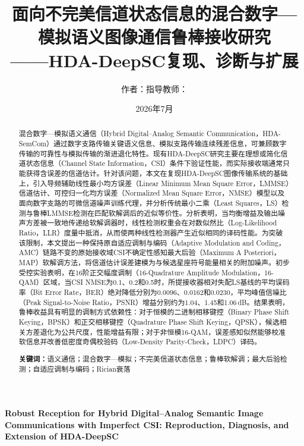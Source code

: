 \documentclass[UTF8,a4paper,11pt]{ctexart}
\title{\heiti 面向不完美信道状态信息的混合数字—模拟语义图像通信鲁棒接收研究\\[0.5em]
\large ——HDA-DeepSC复现、诊断与扩展}
\author{作者：\underline{\hspace{4cm}}\qquad 指导教师：\underline{\hspace{4cm}}}
\date{2026年7月}
\newcommand{\HDADeepSC}{HDA-DeepSC}
\newcommand{\CSI}{CSI}
\newcommand{\AMC}{AMC}
\newcommand{\BER}{BER}
\newcommand{\PSNR}{PSNR}
\newcommand{\NMSE}{NMSE}
\newcommand{\LLR}{LLR}
\newcommand{\LDPC}{LDPC}
\begin{document}
\maketitle

\begin{abstract}
混合数字—模拟语义通信（Hybrid Digital--Analog Semantic Communication，HDA-SemCom）通过数字支路传输关键语义信息、模拟支路传输连续残差信息，可兼顾数字传输的可靠性与模拟传输的渐进退化特性。现有\HDADeepSC{}研究主要在理想或简化信道状态信息（Channel State Information，\CSI）条件下验证性能，而实际接收端通常只能获得含误差的信道估计。针对该问题，本文在复现\HDADeepSC{}图像传输系统的基础上，引入导频辅助线性最小均方误差（Linear Minimum Mean Square Error，LMMSE）信道估计、可控归一化均方误差（Normalized Mean Square Error，\NMSE）模型以及面向数字支路的可微信道噪声训练代理，并分析传统最小二乘（Least Squares，LS）检测与鲁棒LMMSE检测在匹配软解调后的近似等价性。分析表明，当均衡增益及输出噪声方差被一致地传递给软解调器时，线性检测权重会在对数似然比（Log-Likelihood Ratio，\LLR）度量中抵消，从而使两种线性检测器产生近似相同的译码性能。为突破该限制，本文提出一种保持原自适应调制与编码（Adaptive Modulation and Coding，\AMC）链路不变的原始接收域\CSI{}不确定性感知最大后验（Maximum A Posteriori，MAP）软解调方法，将信道估计误差建模为与候选星座符号能量相关的附加噪声。初步受控实验表明，在16阶正交幅度调制（16-Quadrature Amplitude Modulation，16-QAM）区域，当\CSI{} \NMSE{}为0.1、0.2和0.5时，所提接收器相对失配LS基线的平均误码率（Bit Error Rate，\BER）绝对降低分别为0.0096、0.0162和0.0230，平均峰值信噪比（Peak Signal-to-Noise Ratio，\PSNR）增益分别约为1.04、1.45和1.06\,dB。结果表明，鲁棒收益具有明显的调制方式依赖性：对于恒模的二进制相移键控（Binary Phase Shift Keying，BPSK）和正交相移键控（Quadrature Phase Shift Keying，QPSK），候选相关方差退化为公共尺度，性能增益有限；对于非恒模16-QAM，误差感知似然能够校准软信息并改善低密度奇偶校验码（Low-Density Parity-Check，\LDPC）译码。

\noindent\textbf{关键词：}语义通信；混合数字—模拟；不完美信道状态信息；鲁棒软解调；最大后验检测；自适应调制与编码；Rician衰落
\end{abstract}

\begin{center}
\textbf{Robust Reception for Hybrid Digital--Analog Semantic Image Communications with Imperfect CSI: Reproduction, Diagnosis, and Extension of HDA-DeepSC}
\end{center}
\end{document}
